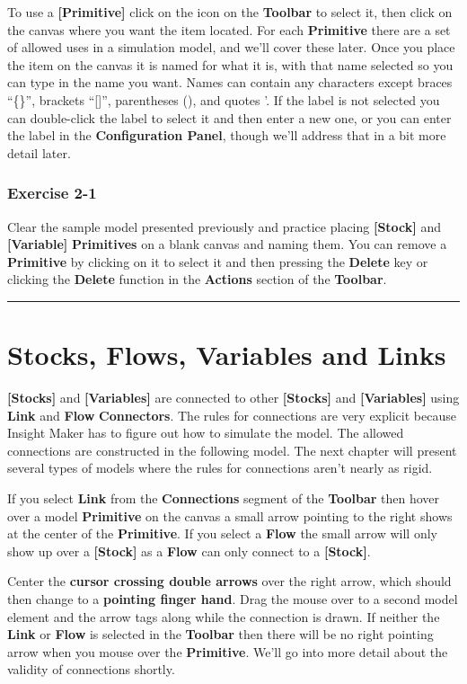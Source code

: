 \documentclass[]{memoir}
\newcommand{\p}[1]{\textbf{{[}#1{]}}}
\renewcommand{\u}[1]{\textbf{#1}}
\begin{document}
To use a \p{Primitive} click on the icon on the \u{Toolbar} to select
it, then click on the canvas where you want the item located. For each
\u{Primitive} there are a set of allowed uses in a simulation model, and
we'll cover these later. Once you place the item on the canvas it is
named for what it is, with that name selected so you can type in the
name you want. Names can contain any characters except braces ``\{\}'',
brackets ``{[}{]}'', parentheses (), and quotes '. If the label is not
selected you can double-click the label to select it and then enter a
new one, or you can enter the label in the \u{Configuration Panel},
though we'll address that in a bit more detail later.

\subsubsection{Exercise 2-1}

Clear the sample model presented previously and practice placing
\p{Stock} and \p{Variable} \u{Primitives} on a blank canvas and naming
them. You can remove a \u{Primitive} by clicking on it to select it and
then pressing the \u{Delete} key or clicking the \u{Delete} function in
the \u{Actions} section of the \u{Toolbar}.

\begin{center}\rule{3in}{0.4pt}\end{center}

\section{Stocks, Flows, Variables and Links}

\p{Stocks} and \p{Variables} are connected to other \p{Stocks} and
\p{Variables} using \u{Link} and \u{Flow} \u{Connectors}. The rules for
connections are very explicit because Insight Maker has to figure out
how to simulate the model. The allowed connections are constructed in
the following model. The next chapter will present several types of
models where the rules for connections aren't nearly as rigid.

If you select \u{Link} from the \u{Connections} segment of the
\u{Toolbar} then hover over a model \u{Primitive} on the canvas a small
arrow pointing to the right shows at the center of the \u{Primitive}. If
you select a \u{Flow} the small arrow will only show up over a \p{Stock}
as a \u{Flow} can only connect to a \p{Stock}.

Center the \u{cursor crossing double arrows} over the right arrow, which
should then change to a \u{pointing finger hand}. Drag the mouse over to
a second model element and the arrow tags along while the connection is
drawn. If neither the \u{Link} or \u{Flow} is selected in the
\u{Toolbar} then there will be no right pointing arrow when you mouse
over the \u{Primitive}. We'll go into more detail about the validity of
connections shortly.
\end{document}
